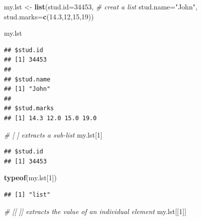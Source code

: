 \documentclass[]{book}
\newenvironment{Shaded}{\begin{snugshade}}{\end{snugshade}}
\newcommand{\KeywordTok}[1]{\textcolor[rgb]{0.13,0.29,0.53}{\textbf{{#1}}}}
\newcommand{\DataTypeTok}[1]{\textcolor[rgb]{0.13,0.29,0.53}{{#1}}}
\newcommand{\DecValTok}[1]{\textcolor[rgb]{0.00,0.00,0.81}{{#1}}}
\newcommand{\FloatTok}[1]{\textcolor[rgb]{0.00,0.00,0.81}{{#1}}}
\newcommand{\StringTok}[1]{\textcolor[rgb]{0.31,0.60,0.02}{{#1}}}
\newcommand{\CommentTok}[1]{\textcolor[rgb]{0.56,0.35,0.01}{\textit{{#1}}}}
\newcommand{\NormalTok}[1]{{#1}}
\begin{document}
\begin{Shaded}
\begin{Highlighting}[]
\NormalTok{my.lst <-}\StringTok{ }\KeywordTok{list}\NormalTok{(}\DataTypeTok{stud.id=}\DecValTok{34453}\NormalTok{,      }\CommentTok{# creat a list}
               \DataTypeTok{stud.name=}\StringTok{"John"}\NormalTok{, }
               \DataTypeTok{stud.marks=}\KeywordTok{c}\NormalTok{(}\FloatTok{14.3}\NormalTok{,}\DecValTok{12}\NormalTok{,}\DecValTok{15}\NormalTok{,}\DecValTok{19}\NormalTok{))}
\end{Highlighting}
\end{Shaded}

\begin{Shaded}
\begin{Highlighting}[]
\NormalTok{my.lst}
\end{Highlighting}
\end{Shaded}

\begin{verbatim}
## $stud.id
## [1] 34453
## 
## $stud.name
## [1] "John"
## 
## $stud.marks
## [1] 14.3 12.0 15.0 19.0
\end{verbatim}

\begin{Shaded}
\begin{Highlighting}[]
\CommentTok{# [ ] extracts a sub-list }
\NormalTok{my.lst[}\DecValTok{1}\NormalTok{]}
\end{Highlighting}
\end{Shaded}

\begin{verbatim}
## $stud.id
## [1] 34453
\end{verbatim}

\begin{Shaded}
\begin{Highlighting}[]
\KeywordTok{typeof}\NormalTok{(my.lst[}\DecValTok{1}\NormalTok{])}
\end{Highlighting}
\end{Shaded}

\begin{verbatim}
## [1] "list"
\end{verbatim}

\begin{Shaded}
\begin{Highlighting}[]
\CommentTok{# [[ ]] extracts the value of an individual element }
\NormalTok{my.lst[[}\DecValTok{1}\NormalTok{]]}
\end{Highlighting}
\end{Shaded}
\end{document}
